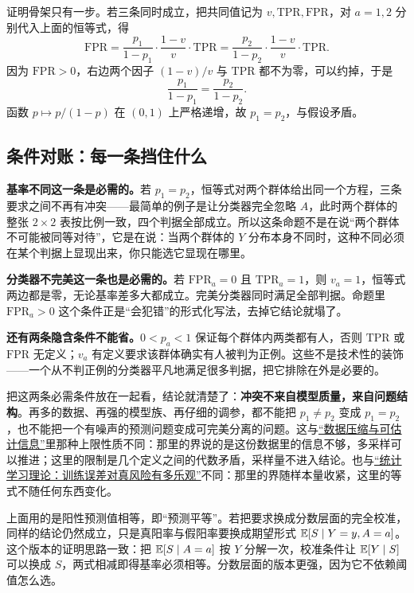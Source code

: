 证明骨架只有一步。若三条同时成立，把共同值记为 \(v,\mathrm{TPR},\mathrm{FPR}\)，对 \(a=1,2\) 分别代入上面的恒等式，得
\[
\mathrm{FPR}=\frac{p_1}{1-p_1}\cdot\frac{1-v}{v}\cdot\mathrm{TPR}
=\frac{p_2}{1-p_2}\cdot\frac{1-v}{v}\cdot\mathrm{TPR}.
\]
因为 \(\mathrm{FPR}>0\)，右边两个因子 \((1-v)/v\) 与 \(\mathrm{TPR}\) 都不为零，可以约掉，于是
\[
\frac{p_1}{1-p_1}=\frac{p_2}{1-p_2}.
\]
函数 \(p\mapsto p/(1-p)\) 在 \((0,1)\) 上严格递增，故 \(p_1=p_2\)，与假设矛盾。

\subsection{条件对账：每一条挡住什么}

\textbf{基率不同这一条是必需的。}若 \(p_1=p_2\)，恒等式对两个群体给出同一个方程，三条要求之间不再有冲突——最简单的例子是让分类器完全忽略 \(A\)，此时两个群体的整张 \(2\times2\) 表按比例一致，四个判据全部成立。所以这条命题不是在说``两个群体不可能被同等对待''，它是在说：当两个群体的 \(Y\) 分布本身不同时，这种不同必须在某个判据上显现出来，你只能选它显现在哪里。

\textbf{分类器不完美这一条也是必需的。}若 \(\mathrm{FPR}_a=0\) 且 \(\mathrm{TPR}_a=1\)，则 \(v_a=1\)，恒等式两边都是零，无论基率差多大都成立。完美分类器同时满足全部判据。命题里 \(\mathrm{FPR}_a>0\) 这个条件正是``会犯错''的形式化写法，去掉它结论就塌了。

\textbf{还有两条隐含条件不能省。}\(0<p_a<1\) 保证每个群体内两类都有人，否则 \(\mathrm{TPR}\) 或 \(\mathrm{FPR}\) 无定义；\(v_a\) 有定义要求该群体确实有人被判为正例。这些不是技术性的装饰——一个从不判正例的分类器平凡地满足很多判据，把它排除在外是必要的。

把这两条必需条件放在一起看，结论就清楚了：\textbf{冲突不来自模型质量，来自问题结构}。再多的数据、再强的模型族、再仔细的调参，都不能把 \(p_1\neq p_2\) 变成 \(p_1=p_2\)，也不能把一个有噪声的预测问题变成可完美分离的问题。这与\hyperref[ch:088]{``数据压缩与可估计信息''}里那种上限性质不同：那里的界说的是这份数据里的信息不够，多采样可以推进；这里的限制是几个定义之间的代数矛盾，采样量不进入结论。也与\hyperref[ch:118]{``统计学习理论：训练误差对真风险有多乐观''}不同：那里的界随样本量收紧，这里的等式不随任何东西变化。

\begin{remark}
上面用的是阳性预测值相等，即``预测平等''。若把要求换成分数层面的完全校准，同样的结论仍然成立，只是真阳率与假阳率要换成期望形式 \(\mathbb{E}[S\mid Y=y,A=a]\)。这个版本的证明思路一致：把 \(\mathbb{E}[S\mid A=a]\) 按 \(Y\) 分解一次，校准条件让 \(\mathbb{E}[Y\mid S]\) 可以换成 \(S\)，两式相减即得基率必须相等。分数层面的版本更强，因为它不依赖阈值怎么选。
\end{remark}

